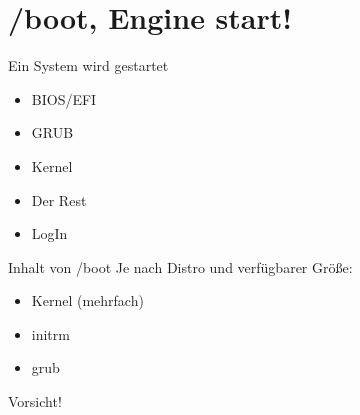 \section[/boot]{/boot, Engine start!}
\begin{frame}{Ein System wird gestartet}
\begin{itemize}
 \item BIOS/EFI
 \item GRUB
 \item Kernel
 \item Der Rest
 \item LogIn
\end{itemize}

\end{frame}

\begin{frame}{Inhalt von /boot}
Je nach Distro und verfügbarer Größe:
\begin{itemize}
 \item Kernel (mehrfach)
 \item initrm
 \item grub
\end{itemize}
\begin{center}
{\large Vorsicht!}
 
\end{center}

\end{frame}